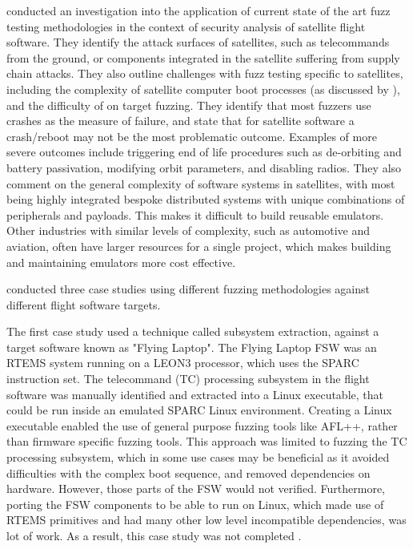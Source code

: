 \documentclass[../report.tex]{subfiles}
\begin{document}
\citet{Willbold_2024} conducted an investigation into the application of
current state of the art fuzz testing methodologies in the context of security
analysis of satellite flight software. They identify the attack surfaces of
satellites, such as telecommands from the ground, or components integrated in
the satellite suffering from supply chain attacks. They also outline challenges
with fuzz testing specific to satellites, including the complexity of satellite
computer boot processes (as discussed by \citet{Scharnowski_2023}), and the
difficulty of on target fuzzing. They identify that most fuzzers use crashes as
the measure of failure, and state that for satellite software a crash/reboot
may not be the most problematic outcome. Examples of more severe outcomes
include triggering end of life procedures such as de-orbiting and battery
passivation, modifying orbit parameters, and disabling radios. They also
comment on the general complexity of software systems in satellites, with most
being highly integrated bespoke distributed systems with unique combinations of
peripherals and payloads. This makes it difficult to build reusable emulators.
Other industries with similar levels of complexity, such as automotive and
aviation, often have larger resources for a single project, which makes
building and maintaining emulators more cost effective.

\citet{Willbold_2024} conducted three case studies using different fuzzing
methodologies against different flight software targets.

The first case study used a technique called subsystem extraction, against a
target software known as "Flying Laptop". The Flying Laptop FSW was an RTEMS
system running on a LEON3 processor, which uses the SPARC instruction set. The
telecommand (TC) processing subsystem in the flight software was manually
identified and extracted into a Linux executable, that could be run inside an
emulated SPARC Linux environment. Creating a Linux executable enabled the use
of general purpose fuzzing tools like AFL++, rather than firmware specific
fuzzing tools. This approach was limited to fuzzing the TC processing
subsystem, which in some use cases may be beneficial as it avoided difficulties
with the complex boot sequence, and removed dependencies on hardware. However,
those parts of the FSW would not verified. Furthermore, porting the FSW
components to be able to run on Linux, which made use of RTEMS primitives and
had many other low level incompatible dependencies, was lot of work. As a
result, this case study was not completed \citep{Willbold_2024}.
\end{document}
